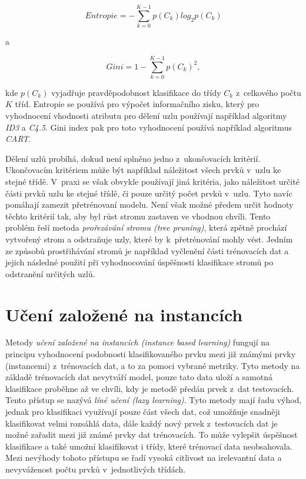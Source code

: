 \begin{equation}
    Entropie = - \sum\limits_{k=0}^{K-1} p(C_k) log_2 p(C_k)
\end{equation}

\medskip

\noindent a

\begin{equation}
    Gini = 1 - \sum\limits_{k=0}^{K-1} p(C_k)^2,
\end{equation}

\medskip

\noindent kde $p(C_k)$ vyjadřuje pravděpodobnost klasifikace do třídy $C_k$ z~celkového počtu $K$ tříd. Entropie se používá pro výpočet informačního zisku, který pro vyhodnocení vhodnosti atributu pro dělení uzlu používají například algoritmy \textit{ID3} a \textit{C4.5}. Gini index pak pro toto vyhodnocení používá například algoritmus \textit{CART}.

Dělení uzlů probíhá, dokud není splněno jedno z~ukončovacích kritérií. Ukončovacím kritériem může být například náležitost všech prvků v~uzlu ke stejné třídě. V~praxi se však obvykle používají jiná kritéria, jako náležitost určité části prvků uzlu ke stejné třídě, či pouze určitý počet prvků v~uzlu. Tyto navíc pomáhají zamezit přetrénovaní modelu. Není však možné předem určit hodnoty těchto kritérií tak, aby byl růst stromu zastaven ve vhodnou chvíli. Tento problém řeší metoda \textit{prořezávání stromu (tree pruning)}, která zpětně prochází vytvořený strom a odstraňuje uzly, které by k~přetrénování mohly vést. Jedním ze způsobů prostřihávání stromů je například vyčlenění části trénovacích dat a jejich následné použití při vyhodnocování úspěšnosti klasifikace stromů po odstranění určitých uzlů.\cite{data_classification}\cite{understanding_machine_learning}\cite{strojove_uceni}\cite{machine_learning}

\section{Učení založené na instancích}
\label{uceni_zalozene_na_instancich}
Metody \textit{učení založené na instancích (instance based learning)} fungují na principu vyhodnocení podobnosti klasifikovaného prvku mezi již známými prvky (instancemi) z~trénovacích dat, a to za pomoci vybrané metriky. Tyto metody na základě trénovacích dat nevytváří model, pouze tato data uloží a samotná klasifikace proběhne až ve chvíli, kdy je metodě předán prvek z~dat testovacích. Tento přístup se nazývá \textit{líné učení (lazy learning)}. Tyto metody mají řadu výhod, jednak pro klasifikaci využívají pouze část všech dat, což umožňuje snadněji klasifikovat velmi rozsáhlá data, dále každý nový prvek z~testovacích dat je možné zařadit mezi již známé prvky dat trénovacích. To může vylepšit úspěšnost klasifikace a také umožní klasifikovat i třídy, které trénovací data neobsahovala. Mezi nevýhody tohoto přístupu se řadí vysoká citlivost na irelevantní data a nevyváženost počtu prvků v~jednotlivých třídách.\cite{data_classification}\cite{machine_learning}\cite{strojove_uceni}

